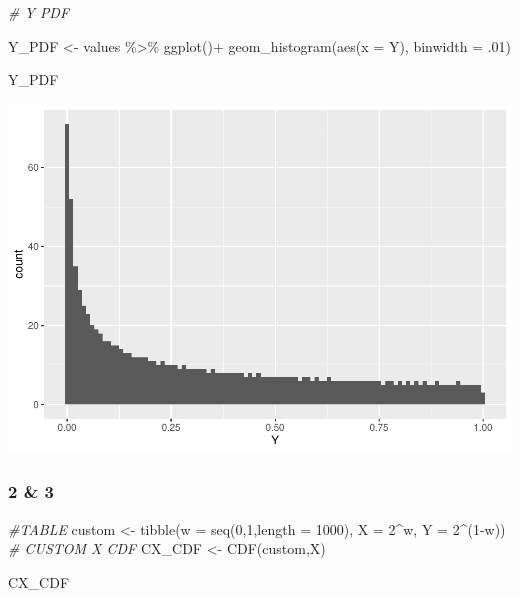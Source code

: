 \documentclass[
]{article}
\newenvironment{Shaded}{\begin{snugshade}}{\end{snugshade}}
\newcommand{\AttributeTok}[1]{\textcolor[rgb]{0.77,0.63,0.00}{#1}}
\newcommand{\CommentTok}[1]{\textcolor[rgb]{0.56,0.35,0.01}{\textit{#1}}}
\newcommand{\DecValTok}[1]{\textcolor[rgb]{0.00,0.00,0.81}{#1}}
\newcommand{\FunctionTok}[1]{\textcolor[rgb]{0.00,0.00,0.00}{#1}}
\newcommand{\NormalTok}[1]{#1}
\newcommand{\OtherTok}[1]{\textcolor[rgb]{0.56,0.35,0.01}{#1}}
\newcommand{\SpecialCharTok}[1]{\textcolor[rgb]{0.00,0.00,0.00}{#1}}
\begin{document}
\begin{Shaded}
\begin{Highlighting}[]
  \CommentTok{\# Y PDF}

\NormalTok{Y\_PDF }\OtherTok{\textless{}{-}}\NormalTok{ values }\SpecialCharTok{\%\textgreater{}\%} 
  \FunctionTok{ggplot}\NormalTok{()}\SpecialCharTok{+}
  \FunctionTok{geom\_histogram}\NormalTok{(}\FunctionTok{aes}\NormalTok{(}\AttributeTok{x =}\NormalTok{ Y), }\AttributeTok{binwidth =}\NormalTok{ .}\DecValTok{01}\NormalTok{)}

\NormalTok{Y\_PDF}
\end{Highlighting}
\end{Shaded}

\includegraphics{HW-3_files/figure-latex/unnamed-chunk-1-4.pdf}

\hypertarget{section-2}{%
\subsubsection{2 \& 3}\label{section-2}}

\begin{Shaded}
\begin{Highlighting}[]
\CommentTok{\#TABLE}
\NormalTok{custom }\OtherTok{\textless{}{-}} \FunctionTok{tibble}\NormalTok{(}\AttributeTok{w =} \FunctionTok{seq}\NormalTok{(}\DecValTok{0}\NormalTok{,}\DecValTok{1}\NormalTok{,}\AttributeTok{length =} \DecValTok{1000}\NormalTok{),}
                 \AttributeTok{X =} \DecValTok{2}\SpecialCharTok{\^{}}\NormalTok{w,}
                 \AttributeTok{Y =} \DecValTok{2}\SpecialCharTok{\^{}}\NormalTok{(}\DecValTok{1}\SpecialCharTok{{-}}\NormalTok{w))}
\CommentTok{\# CUSTOM X CDF}
\NormalTok{CX\_CDF }\OtherTok{\textless{}{-}} \FunctionTok{CDF}\NormalTok{(custom,X)}

\NormalTok{CX\_CDF}
\end{Highlighting}
\end{Shaded}
\end{document}
